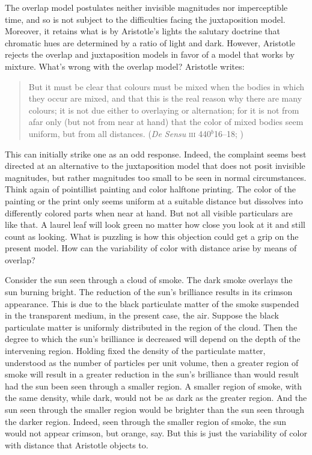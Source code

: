 The overlap model postulates neither invisible magnitudes nor imperceptible time, and so is not subject to the difficulties facing the juxtaposition model. Moreover, it retains what is by Aristotle's lights the salutary doctrine that chromatic hues are determined by a ratio of light and dark. However, Aristotle rejects the overlap and juxtaposition models in favor of a model that works by mixture. What's wrong with the overlap model? Aristotle writes:
\begin{quote}
	But it must be clear that colours must be mixed when the bodies in which they occur are mixed, and that this is the real reason why there are many colours; it is not due either to overlaying or alternation; for it is not from afar only (but not from near at hand) that the color of mixed bodies seem uniform, but from all distances. (\emph{De Sensu} \textsc{iii} 440\( ^{b} \)16--18; \citealt[237]{Hett:1936fk})
\end{quote}
This can initially strike one as an odd response. Indeed, the complaint seems best directed at an alternative to the juxtaposition model that does not posit invisible magnitudes, but rather magnitudes too small to be seen in normal circumstances. Think again of pointillist painting and color halftone printing. The color of the painting or the print only seems uniform at a suitable distance but dissolves into differently colored parts when near at hand. But not all visible particulars are like that. A laurel leaf will look green no matter how close you look at it and still count as looking. What is puzzling is how this objection could get a grip on the present model. How can the variability of color with distance arise by means of overlap?

Consider the sun seen through a cloud of smoke. The dark smoke overlays the sun burning bright. The reduction of the sun's brilliance results in its crimson appearance. This is due to the black particulate matter of the smoke suspended in the transparent medium, in the present case, the air. Suppose the black particulate matter is uniformly distributed in the region of the cloud. Then the degree to which the sun's brilliance is decreased will depend on the depth of the intervening region. Holding fixed the density of the particulate matter, understood as the number of particles per unit volume, then a greater region of smoke will result in a greater reduction in the sun's brilliance than would result had the sun been seen through a smaller region. A smaller region of smoke, with the same density, while dark, would not be as dark as the greater region. And the sun seen through the smaller region would be brighter than the sun seen through the darker region. Indeed, seen through the smaller region of smoke, the sun would not appear crimson, but orange, say. But this is just the variability of color with distance that Aristotle objects to.

